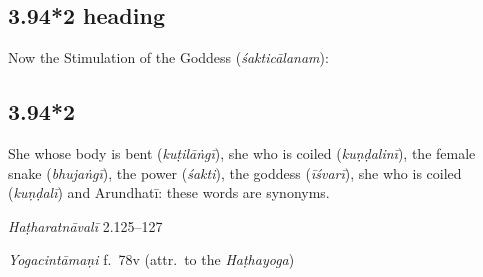 \begin{ekdosis}
\subsection*{3.94*2 heading}
\begin{translation}[hp03_094_2a]
Now the Stimulation of the Goddess (\emph{śakticālanam}):
\end{translation}


\subsection*{3.94*2}
\begin{translation}[hp03_094_2]
She whose body is bent (\emph{kuṭilāṅgī}), she who is coiled (\emph{kuṇḍalinī}), the female snake (\emph{bhujaṅgī}), the power (\emph{śakti}), the goddess (\emph{īśvarī}), she who is coiled (\emph{kuṇḍalī}) and Arundhatī: these words are synonyms.
\end{translation}
% 

\begin{testimonia}[hp03_094_2]

\emph{Haṭharatnāvalī} 2.125–127
\begin{versinnote}
\end{versinnote}

\emph{Yogacintāmaṇi} f.~78v (attr.~to the \emph{Haṭhayoga})
\begin{versinnote}
\end{versinnote}


\end{testimonia}
\end{ekdosis}
